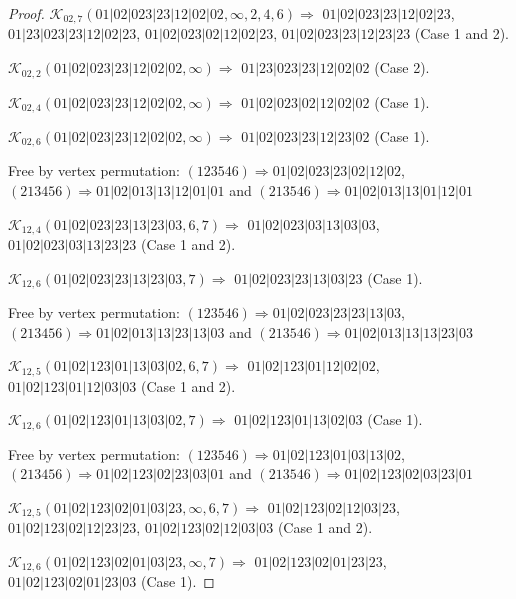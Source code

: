 \documentclass[12pt]{article}
\theoremstyle{plain}
\theoremstyle{definition}
\theoremstyle{remark}
\newcommand{\fancy}[1]{\mathcal{#1}}
\def\K{\fancy{K}}
\begin{document}
\begin{proof}
	
	
	\bigskip
	
	$\K_{02,7}(01|02|023|23|12|02|02,\infty,2, 4, 6)\Rightarrow $ $01|02|023|23|12|02|23$, $01|23|023|23|12|02|23$, $01|02|023|02|12|02|23$, $01|02|023|23|12|23|23$ (Case 1 and 2).
	
	$\K_{02,2}(01|02|023|23|12|02|02,\infty)\Rightarrow $ $01|23|023|23|12|02|02$ (Case 2).
	
	$\K_{02,4}(01|02|023|23|12|02|02,\infty)\Rightarrow $ $01|02|023|02|12|02|02$ (Case 1).
	
	$\K_{02,6}(01|02|023|23|12|02|02,\infty)\Rightarrow $ $01|02|023|23|12|23|02$ (Case 1).
	
	
	
	Free by vertex permutation: $(1 2 3 5 4 6)\Rightarrow 01|02|023|23|02|12|02$, $(2 1 3 4 5 6)\Rightarrow 01|02|013|13|12|01|01$ and $(2 1 3 5 4 6)\Rightarrow 01|02|013|13|01|12|01$
	
	
	
	\bigskip
	
	$\K_{12,4}(01|02|023|23|13|23|03,6, 7)\Rightarrow $ $01|02|023|03|13|03|03$, $01|02|023|03|13|23|23$ (Case 1 and 2).
	
	$\K_{12,6}(01|02|023|23|13|23|03,7)\Rightarrow $ $01|02|023|23|13|03|23$ (Case 1).
	
	
	
	Free by vertex permutation: $(1 2 3 5 4 6)\Rightarrow 01|02|023|23|23|13|03$, $(2 1 3 4 5 6)\Rightarrow 01|02|013|13|23|13|03$ and $(2 1 3 5 4 6)\Rightarrow 01|02|013|13|13|23|03$
	
	
	
	\bigskip
	
	$\K_{12,5}(01|02|123|01|13|03|02,6, 7)\Rightarrow $ $01|02|123|01|12|02|02$, $01|02|123|01|12|03|03$ (Case 1 and 2).
	
	$\K_{12,6}(01|02|123|01|13|03|02,7)\Rightarrow $ $01|02|123|01|13|02|03$ (Case 1).
	
	
	
	Free by vertex permutation: $(1 2 3 5 4 6)\Rightarrow 01|02|123|01|03|13|02$, $(2 1 3 4 5 6)\Rightarrow 01|02|123|02|23|03|01$ and $(2 1 3 5 4 6)\Rightarrow 01|02|123|02|03|23|01$
	
	
	
	\bigskip
	
	$\K_{12,5}(01|02|123|02|01|03|23,\infty,6, 7)\Rightarrow $ $01|02|123|02|12|03|23$, $01|02|123|02|12|23|23$, $01|02|123|02|12|03|03$ (Case 1 and 2).
	
	$\K_{12,6}(01|02|123|02|01|03|23,\infty,7)\Rightarrow $ $01|02|123|02|01|23|23$, $01|02|123|02|01|23|03$ (Case 1).
	

\end{proof}
\end{document}
